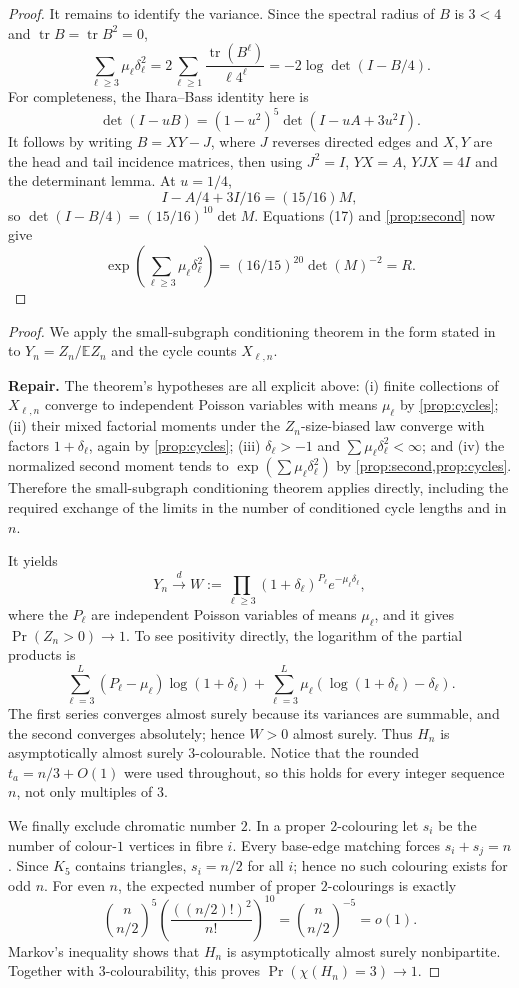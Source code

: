\documentclass[11pt,a4paper]{article}
\theoremstyle{plain}
\theoremstyle{definition}
\theoremstyle{remark}
\newcommand{\E}{\mathbb E}
\newcommand{\tr}{\operatorname{tr}}
\newcommand{\repair}[1]{\begin{tcolorbox}[colback=yellow!7,colframe=gray!60,boxrule=0.3pt,arc=1pt,left=5pt,right=5pt,top=3pt,bottom=3pt]\small\textbf{Repair.} #1\end{tcolorbox}}
\begin{document}
\begin{proof}
It remains to identify the variance.  Since the spectral radius of $B$ is $3<4$ and
$\tr B=\tr B^2=0$,
\[
 \sum_{\ell\ge3}\mu_\ell\delta_\ell^2
 =2\sum_{\ell\ge1}\frac{\tr(B^\ell)}{\ell4^\ell}
 =-2\log\det(I-B/4).                                           \tag{17}
\]
For completeness, the Ihara--Bass identity here is
\[
 \det(I-uB)=(1-u^2)^5\det(I-uA+3u^2I).                         \tag{18}
\]
It follows by writing $B=XY-J$, where $J$ reverses directed edges and $X,Y$ are the
head and tail incidence matrices, then using $J^2=I$, $YX=A$, $YJX=4I$ and the
determinant lemma.  At $u=1/4$,
\[
 I-A/4+3I/16=(15/16)M,
\]
so $\det(I-B/4)=(15/16)^{10}\det M$.  Equations (17) and
\cref{prop:second} now give
\[
 \exp\left(\sum_{\ell\ge3}\mu_\ell\delta_\ell^2\right)
 =(16/15)^{20}\det(M)^{-2}=R.
\]
\end{proof}

\label{pf:main}
\thmmain*
\begin{proof}
We apply the small-subgraph conditioning theorem in the form stated in
\cite[Section~4]{Wormald99} to $Y_n=Z_n/\E Z_n$ and the cycle counts $X_{\ell,n}$.

\repair{The theorem's hypotheses are all explicit above: (i) finite collections of
$X_{\ell,n}$ converge to independent Poisson variables with means $\mu_\ell$ by
\cref{prop:cycles}; (ii) their mixed factorial moments under the $Z_n$-size-biased law
converge with factors $1+\delta_\ell$, again by \cref{prop:cycles};
(iii) $\delta_\ell>-1$ and
$\sum\mu_\ell\delta_\ell^2<\infty$; and (iv) the normalized second moment tends to
$\exp(\sum\mu_\ell\delta_\ell^2)$ by \cref{prop:second,prop:cycles}.  Therefore the
small-subgraph conditioning theorem applies directly, including the required exchange
of the limits in the number of conditioned cycle lengths and in $n$.}

It yields
\[
 Y_n\xrightarrow{d}W:=\prod_{\ell\ge3}
 (1+\delta_\ell)^{P_\ell}e^{-\mu_\ell\delta_\ell},              \tag{19}
\]
where the $P_\ell$ are independent Poisson variables of means $\mu_\ell$, and it gives
$\Pr(Z_n>0)\to1$.  To see positivity directly, the logarithm of the partial products is
\[
 \sum_{\ell=3}^L(P_\ell-\mu_\ell)\log(1+\delta_\ell)
 +\sum_{\ell=3}^L\mu_\ell(\log(1+\delta_\ell)-\delta_\ell).
\]
The first series converges almost surely because its variances are summable, and the
second converges absolutely; hence $W>0$ almost surely.  Thus $H_n$ is asymptotically
almost surely $3$-colourable.  Notice that the rounded $t_a=n/3+O(1)$ were used
throughout, so this holds for every integer sequence $n$, not only multiples of $3$.

We finally exclude chromatic number $2$.  In a proper $2$-colouring let $s_i$ be the
number of colour-$1$ vertices in fibre $i$.  Every base-edge matching forces
$s_i+s_j=n$.  Since $K_5$ contains triangles, $s_i=n/2$ for all $i$; hence no such
colouring exists for odd $n$.  For even $n$, the expected number of proper
$2$-colourings is exactly
\[
 \binom{n}{n/2}^{5}
 \left(\frac{((n/2)!)^2}{n!}\right)^{10}
 =\binom{n}{n/2}^{-5}=o(1).
\]
Markov's inequality shows that $H_n$ is asymptotically almost surely nonbipartite.
Together with $3$-colourability, this proves $\Pr(\chi(H_n)=3)\to1$.
\end{proof}
\end{document}
